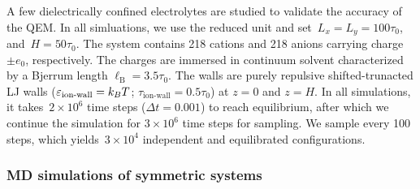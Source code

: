 
A few dielectrically confined electrolytes are studied to validate the accuracy of the QEM.
In all simluations, we use the reduced unit and set~$L_x = L_y = 100 \tau_0$, and~$H = 50 \tau_0$.
The system contains 218 cations and 218 anions carrying charge~$\pm e_0$, respectively.
The charges are immersed in continuum solvent characterized by a Bjerrum length $\ell_{\mathrm B} = 3.5 \tau_0$.
The walls are purely repulsive shifted-trunacted LJ walls ($\varepsilon_\text{ion-wall} = k_B T$; $\tau_\text{ion-wall} = 0.5 \tau_0$) at $z = 0$ and $z = H$.
In all simulations, it takes~$2 \times 10^6$ time steps ($\Delta t = 0.001$) to reach equilibrium, after which we continue the simulation for $3 \times 10^6$ time steps for sampling.
We sample every 100 steps, which yields~$3 \times 10^{4}$ independent and equilibrated configurations.

\subsubsection{MD simulations of symmetric systems}

